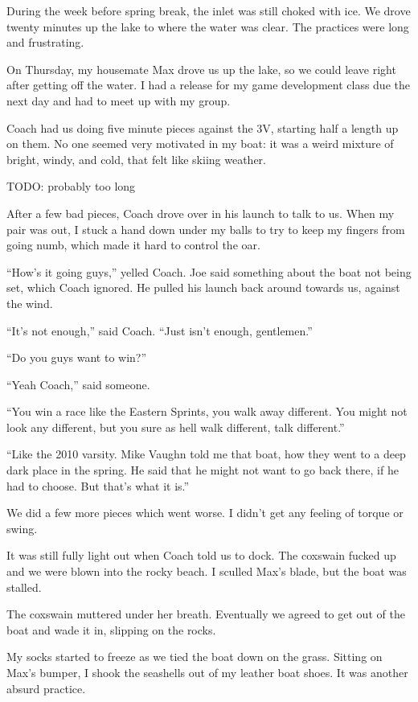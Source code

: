During the week before spring break, the inlet was still choked with ice. We
drove twenty minutes up the lake to where the water was clear.  The practices
were long and frustrating.

On Thursday, my housemate Max drove us up the lake, so we could leave right
after getting off the water.  I had a release for my game development class due
the next day and had to meet up with my group.

Coach had us doing five minute pieces against the 3V, starting half a
length up on them.  No one seemed very motivated in my boat: it was a weird
mixture of bright, windy, and cold, that felt like skiing weather.

TODO: probably too long

After a few bad pieces, Coach drove over in his launch to talk to us.  When my
pair was out, I stuck a hand down under my balls to try to keep my fingers from
going numb, which made it hard to control the oar.

``How's it going guys,'' yelled Coach.  Joe said something about the boat not
being set, which Coach ignored.  He pulled his launch back around towards us,
against the wind.

``It's not enough,'' said Coach.  ``Just isn't enough, gentlemen.''

``Do you guys want to win?''

``Yeah Coach,'' said someone.

``You win a race like the Eastern Sprints, you walk away different.  You might
not look any different, but you sure as hell walk different, talk different.''

``Like the 2010 varsity.  Mike Vaughn told me that boat, how they went to a deep
dark place in the spring.  He said that he might not want to go back there, if
he had to choose.  But that's what it is.''

We did a few more pieces which went worse.  I didn't get any feeling of torque
or swing.  

It was still fully light out when Coach told us to dock.  The coxswain fucked up
and we were blown into the rocky beach.  I sculled Max's blade, but the
boat was stalled.

The coxswain muttered under her breath.  Eventually we agreed to get out of the
boat and wade it in, slipping on the rocks.

My socks started to freeze as we tied the boat down on the grass.  Sitting on
Max's bumper, I shook the seashells out of my leather boat shoes.  It was
another absurd practice.  

